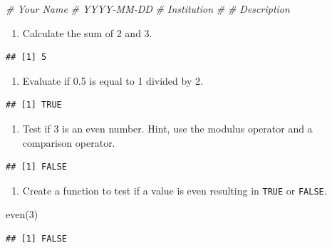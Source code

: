\documentclass[
]{book}
\newenvironment{Shaded}{\begin{snugshade}}{\end{snugshade}}
\newcommand{\CommentTok}[1]{\textcolor[rgb]{0.56,0.35,0.01}{\textit{#1}}}
\newcommand{\DecValTok}[1]{\textcolor[rgb]{0.00,0.00,0.81}{#1}}
\newcommand{\FunctionTok}[1]{\textcolor[rgb]{0.00,0.00,0.00}{#1}}
\newcommand{\NormalTok}[1]{#1}
\providecommand{\tightlist}{%
  \setlength{\itemsep}{0pt}\setlength{\parskip}{0pt}}
\begin{document}
\begin{Shaded}
\begin{Highlighting}[]
\CommentTok{\# Your Name}
\CommentTok{\# YYYY{-}MM{-}DD}
\CommentTok{\# Institution}
\CommentTok{\#}
\CommentTok{\# Description}
\end{Highlighting}
\end{Shaded}

\begin{enumerate}
\def\labelenumi{\arabic{enumi}.}
\setcounter{enumi}{2}
\tightlist
\item
  Calculate the sum of 2 and 3.
\end{enumerate}

\begin{verbatim}
## [1] 5
\end{verbatim}

\begin{enumerate}
\def\labelenumi{\arabic{enumi}.}
\setcounter{enumi}{3}
\tightlist
\item
  Evaluate if 0.5 is equal to 1 divided by 2.
\end{enumerate}

\begin{verbatim}
## [1] TRUE
\end{verbatim}

\begin{enumerate}
\def\labelenumi{\arabic{enumi}.}
\setcounter{enumi}{4}
\tightlist
\item
  Test if 3 is an even number. Hint, use the modulus operator and a comparison operator.
\end{enumerate}

\begin{verbatim}
## [1] FALSE
\end{verbatim}

\begin{enumerate}
\def\labelenumi{\arabic{enumi}.}
\setcounter{enumi}{5}
\tightlist
\item
  Create a function to test if a value is even resulting in \texttt{TRUE} or \texttt{FALSE}.
\end{enumerate}

\begin{Shaded}
\begin{Highlighting}[]
\FunctionTok{even}\NormalTok{(}\DecValTok{3}\NormalTok{)}
\end{Highlighting}
\end{Shaded}

\begin{verbatim}
## [1] FALSE
\end{verbatim}
\end{document}
